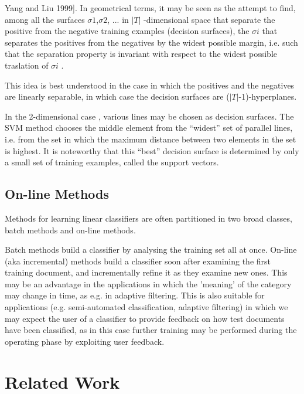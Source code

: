 Yang and Liu 1999]. In geometrical terms, it may be seen as the attempt to
find, among all the surfaces $\sigma 1$,$ \sigma 2$, ... in $|T|$ -dimensional
space that separate the positive from the negative training examples (decision
        surfaces), the $\sigma i$ that separates the positives from the negatives by the widest possible margin, i.e. such that the separation property is invariant with respect to the widest possible traslation of $\sigma i$ .

This idea is best understood in the case in which the positives and the
negatives are linearly separable, in which case the decision surfaces are
($|T|$-1)-hyperplanes.

In the 2-dimensional case , various lines may be chosen as decision surfaces. The SVM method chooses the middle element from the “widest” set of parallel lines, i.e. from the set in which the maximum distance between two elements in the set is highest. It is noteworthy that this “best” decision surface is determined by only a small set of training examples, called the support vectors.

\subsection{On-line Methods}
Methods for learning linear classifiers are often partitioned in two broad classes, batch methods and on-line methods.

Batch methods build a classifier by analysing the training set all at once. On-line (aka incremental) methods build a classifier soon after examining the first training document, and incrementally refine it as they examine new ones. This may be an advantage in the applications in which the 'meaning' of the category may change in time, as e.g. in adaptive filtering. This is also suitable for applications (e.g. semi-automated classification, adaptive filtering) in which we may expect the user of a classifier to provide feedback on how test documents have been classified, as in this case further training may be performed during the operating phase by exploiting user feedback.

\section{Related Work}
